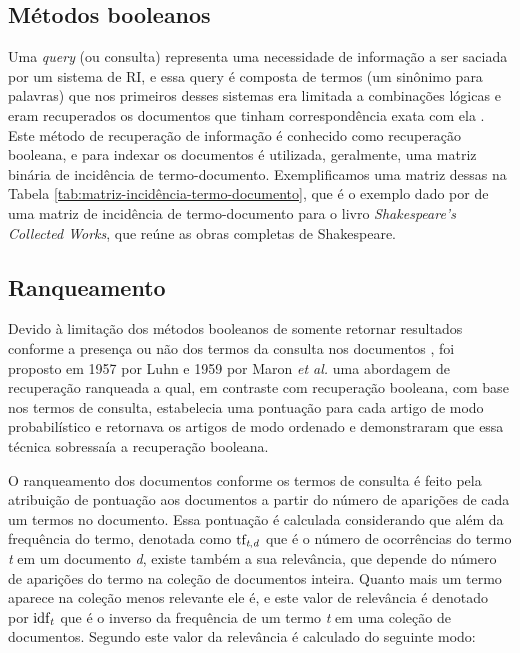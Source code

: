 \subsection{Métodos booleanos} \label{subsec:MétodosBooleanos}

Uma \textit{query} (ou consulta) representa uma necessidade de informação a ser saciada por um sistema de RI, e essa query é composta de termos (um sinônimo para palavras) que nos primeiros desses sistemas era limitada a combinações lógicas e eram recuperados os documentos que tinham correspondência exata com ela \cite[p.~1446]{Sanderson2012THIRR}. 
Este método de recuperação de informação é conhecido como recuperação booleana, e para indexar os documentos é utilizada, geralmente, uma matriz binária de incidência de termo-documento. 
Exemplificamos uma matriz dessas na Tabela \ref{tab:matriz-incidência-termo-documento}, que é o exemplo dado por  de uma matriz de incidência de termo-documento para o livro \textit{Shakespeare’s Collected Works}, que reúne as obras completas de Shakespeare.



\subsection{Ranqueamento} \label{subsec:Ranqueamento}
Devido à limitação dos métodos booleanos de somente retornar resultados conforme a presença ou não dos termos da consulta nos documentos \cite[p.~100]{Manning2008IIR}, foi proposto em 1957 por Luhn e 1959 por Maron \textit{et al.} uma abordagem de recuperação ranqueada \cite[p.~1446]{Sanderson2012THIRR} a qual, em contraste com recuperação booleana, com base nos termos de consulta, estabelecia uma pontuação para cada artigo de modo probabilístico e retornava os artigos de modo ordenado e demonstraram que essa técnica sobressaía a recuperação booleana.

O ranqueamento dos documentos conforme os termos de consulta é feito pela atribuição de pontuação aos documentos a partir do número de aparições de cada um termos no documento.
Essa pontuação é calculada considerando que além da frequência do termo, denotada como $\text{tf}_{\text{\textit{t},\textit{d}}}$ que é o número de ocorrências do termo \textit{t} em um documento \textit{d}, existe também a sua relevância, que depende do número de aparições do termo na coleção de documentos inteira.
Quanto mais um termo aparece na coleção menos relevante ele é, e este valor de relevância é denotado por $\text{idf}_{\text{\textit{t}}}$ que é o inverso da frequência de um termo \textit{t} em uma coleção de documentos.
Segundo  este valor da relevância é calculado do seguinte modo:

